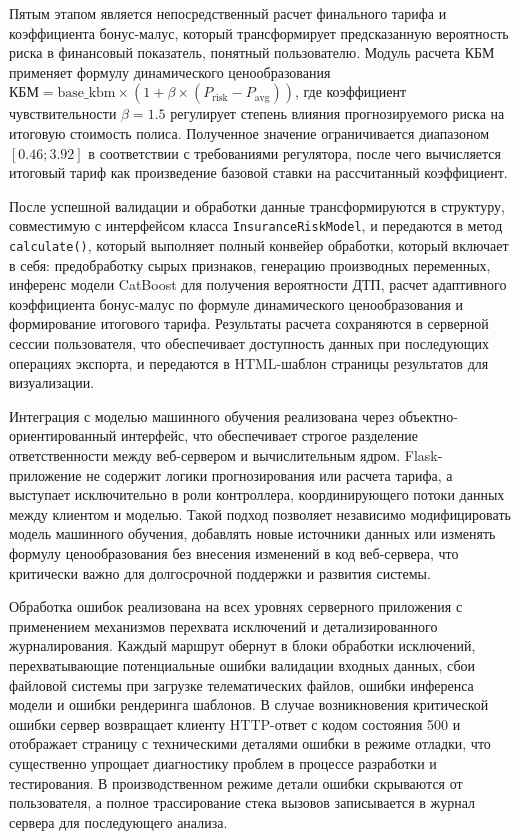 Пятым этапом является непосредственный расчет финального тарифа и коэффициента бонус-малус, который трансформирует предсказанную вероятность риска в финансовый показатель, понятный пользователю. Модуль расчета КБМ применяет формулу динамического ценообразования $\text{КБМ} = \text{base\_kbm} \times (1 + \beta \times (P_{\text{risk}} - P_{\text{avg}}))$, где коэффициент чувствительности $\beta = 1.5$ регулирует степень влияния прогнозируемого риска на итоговую стоимость полиса. Полученное значение ограничивается диапазоном $[0.46; 3.92]$ в соответствии с требованиями регулятора, после чего вычисляется итоговый тариф как произведение базовой ставки на рассчитанный коэффициент.

После успешной валидации и обработки данные трансформируются в структуру, совместимую с интерфейсом класса \texttt{InsuranceRiskModel}, и передаются в метод \texttt{calculate()}, который выполняет полный конвейер обработки, который включает в себя: предобработку сырых признаков, генерацию производных переменных, инференс модели CatBoost для получения вероятности ДТП, расчет адаптивного коэффициента бонус-малус по формуле динамического ценообразования и формирование итогового тарифа. Результаты расчета сохраняются в серверной сессии пользователя, что обеспечивает доступность данных при последующих операциях экспорта, и передаются в HTML-шаблон страницы результатов для визуализации.

Интеграция с моделью машинного обучения реализована через объектно-ориентированный интерфейс, что обеспечивает строгое разделение ответственности между веб-сервером и вычислительным ядром. Flask-приложение не содержит логики прогнозирования или расчета тарифа, а выступает исключительно в роли контроллера, координирующего потоки данных между клиентом и моделью. Такой подход позволяет независимо модифицировать модель машинного обучения, добавлять новые источники данных или изменять формулу ценообразования без внесения изменений в код веб-сервера, что критически важно для долгосрочной поддержки и развития системы.

Обработка ошибок реализована на всех уровнях серверного приложения с применением механизмов перехвата исключений и детализированного журналирования. Каждый маршрут обернут в блоки обработки исключений, перехватывающие потенциальные ошибки валидации входных данных, сбои файловой системы при загрузке телематических файлов, ошибки инференса модели и ошибки рендеринга шаблонов. В случае возникновения критической ошибки сервер возвращает клиенту HTTP-ответ с кодом состояния 500 и отображает страницу с техническими деталями ошибки в режиме отладки, что существенно упрощает диагностику проблем в процессе разработки и тестирования. В производственном режиме детали ошибки скрываются от пользователя, а полное трассирование стека вызовов записывается в журнал сервера для последующего анализа.

